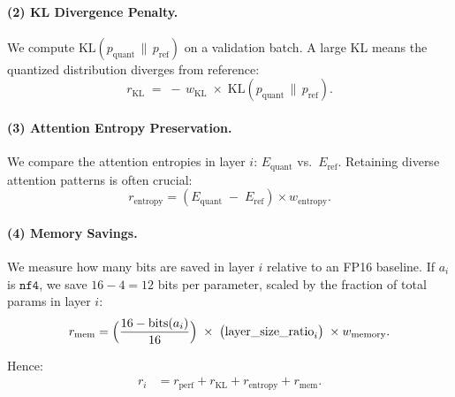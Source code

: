 \documentclass{article}
\begin{document}
	\paragraph{(2) KL Divergence Penalty.}
	We compute $\mathrm{KL}(p_\text{quant}\,\|\,p_\text{ref})$ on a validation batch. A large KL means the quantized distribution diverges from reference:
	\begin{equation}
		r_{\mathrm{KL}} \;=\; -\, w_{\mathrm{KL}} \;\times\; \mathrm{KL}(p_\text{quant}\,\|\,p_\text{ref}).
	\end{equation}
	
	\paragraph{(3) Attention Entropy Preservation.}
	We compare the attention entropies in layer $i$: $E_\text{quant}$ vs.\ $E_\text{ref}$. Retaining diverse attention patterns is often crucial:
	\begin{equation}
		r_{\mathrm{entropy}} = (E_\text{quant} \;-\; E_\text{ref}) \times w_{\mathrm{entropy}}.
	\end{equation}
	
	\paragraph{(4) Memory Savings.}
	We measure how many bits are saved in layer $i$ relative to an FP16 baseline. If $a_i$ is $\texttt{nf4}$, we save $16-4=12$ bits per parameter, scaled by the fraction of total params in layer $i$:
	\begin{equation}
		r_{\mathrm{mem}} = \Bigl(\frac{16 - \text{bits}(a_i)}{16}\Bigr)\;\times \;\bigl(\text{layer\_size\_ratio}_i\bigr)\;\times w_{\mathrm{memory}}.
	\end{equation}
	
	Hence:
	\begin{align}
		r_i &= r_{\mathrm{perf}} + r_{\mathrm{KL}} + r_{\mathrm{entropy}} + r_{\mathrm{mem}}.
		\label{eq:reward_final}
	\end{align}
	
\end{document}
